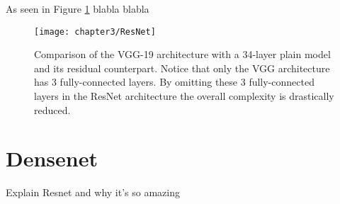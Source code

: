 As seen in Figure \ref{fig:ResNet} blabla blabla

\begin{figure}[H]
  \centering
  \caption{Comparison of the VGG-19 architecture with a 34-layer plain model and its residual counterpart. Notice that only the VGG architecture has 3 fully-connected layers. By omitting these 3 fully-connected layers in the ResNet architecture the overall complexity is drastically reduced. \cite{he2016deep}}
  \texttt{[image: chapter3/ResNet]}
  \label{fig:ResNet}
\end{figure}

\section{Densenet}

Explain Resnet and why it's so amazing

